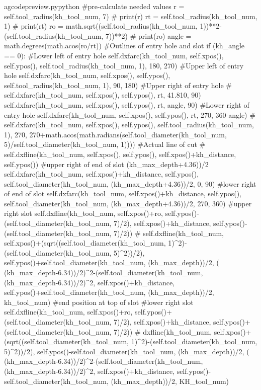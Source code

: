 \documentclass{ltxdoc}
\begin{document}
\lstset{firstnumber=\thegcpy}
\begin{writecode}{a}{gcodepreview.py}{python}
#pre-calculate needed values
        r = self.tool_radius(kh_tool_num, 7)
#        print(r)
        rt = self.tool_radius(kh_tool_num, 1)
#        print(rt)
        ro = math.sqrt((self.tool_radius(kh_tool_num, 1))**2-(self.tool_radius(kh_tool_num, 7))**2)
#        print(ro)
        angle = math.degrees(math.acos(ro/rt))
#Outlines of entry hole and slot
        if (kh_angle == 0):
#Lower left of entry hole
            self.dxfarc(kh_tool_num, self.xpos(), self.ypos(), self.tool_radius(kh_tool_num, 1), 180, 270)
#Upper left of entry hole
            self.dxfarc(kh_tool_num, self.xpos(), self.ypos(), self.tool_radius(kh_tool_num, 1), 90, 180)
#Upper right of entry hole
#            self.dxfarc(kh_tool_num, self.xpos(), self.ypos(), rt, 41.810, 90)
            self.dxfarc(kh_tool_num, self.xpos(), self.ypos(), rt, angle, 90)
#Lower right of entry hole
            self.dxfarc(kh_tool_num, self.xpos(), self.ypos(), rt, 270, 360-angle)
#            self.dxfarc(kh_tool_num, self.xpos(), self.ypos(), self.tool_radius(kh_tool_num, 1), 270, 270+math.acos(math.radians(self.tool_diameter(kh_tool_num, 5)/self.tool_diameter(kh_tool_num, 1))))
#Actual line of cut
#            self.dxfline(kh_tool_num, self.xpos(), self.ypos(), self.xpos()+kh_distance, self.ypos())
#upper right of end of slot (kh_max_depth+4.36))/2
            self.dxfarc(kh_tool_num, self.xpos()+kh_distance, self.ypos(), self.tool_diameter(kh_tool_num, (kh_max_depth+4.36))/2, 0, 90)
#lower right of end of slot
            self.dxfarc(kh_tool_num, self.xpos()+kh_distance, self.ypos(), self.tool_diameter(kh_tool_num, (kh_max_depth+4.36))/2, 270, 360)
#upper right slot
            self.dxfline(kh_tool_num, self.xpos()+ro, self.ypos()-(self.tool_diameter(kh_tool_num, 7)/2), self.xpos()+kh_distance, self.ypos()-(self.tool_diameter(kh_tool_num, 7)/2))
#            self.dxfline(kh_tool_num, self.xpos()+(sqrt((self.tool_diameter(kh_tool_num, 1)^2)-(self.tool_diameter(kh_tool_num, 5)^2))/2), self.ypos()+self.tool_diameter(kh_tool_num, (kh_max_depth))/2, ( (kh_max_depth-6.34))/2)^2-(self.tool_diameter(kh_tool_num, (kh_max_depth-6.34))/2)^2, self.xpos()+kh_distance, self.ypos()+self.tool_diameter(kh_tool_num, (kh_max_depth))/2, kh_tool_num)
#end position at top of slot
#lower right slot
            self.dxfline(kh_tool_num, self.xpos()+ro, self.ypos()+(self.tool_diameter(kh_tool_num, 7)/2), self.xpos()+kh_distance, self.ypos()+(self.tool_diameter(kh_tool_num, 7)/2))
#        dxfline(kh_tool_num, self.xpos()+(sqrt((self.tool_diameter(kh_tool_num, 1)^2)-(self.tool_diameter(kh_tool_num, 5)^2))/2), self.ypos()-self.tool_diameter(kh_tool_num, (kh_max_depth))/2, ( (kh_max_depth-6.34))/2)^2-(self.tool_diameter(kh_tool_num, (kh_max_depth-6.34))/2)^2, self.xpos()+kh_distance, self.ypos()-self.tool_diameter(kh_tool_num, (kh_max_depth))/2, KH_tool_num)

\end{writecode}
\end{document}
